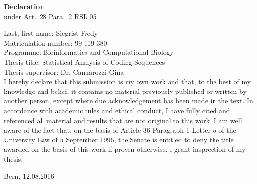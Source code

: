%
\pagestyle{empty}

\begin{center}
  {\Large \bf Declaration}\\[3ex]
  under Art.~28 Para.~2 RSL 05
\end{center}

\vspace{5ex}

  Last, first name: Siegrist Fredy \\[2ex]

  Matriculation number: 99-119-380\\[2ex]

  Programme: Bioinformatics and Computational Biology\\[1ex]

  Thesis title: Statistical Analysis of                     Coding Sequences\\[4ex]
                   
  Thesis supervisor: Dr. Cannarozzi Gina\\[2ex]

\vspace{4ex}
I hereby declare that this submission is my own work and that, to the best of my knowledge and belief, it contains no material previously published or written by another person, except where due acknowledgement has been made in the text. In accordance with academic rules and ethical conduct, I have fully cited and referenced all material and results that are not original to this work. I am well aware of the fact that, on the basis of Article 36 Paragraph 1 Letter o of the University Law of 5 September 1996, the Senate is entitled to deny the title awarded on the basis of this work if proven otherwise. I grant insprection of my thesis.

\vspace{5ex}

Bern, 12.08.2016\\
\vspace*{1ex}\\
%